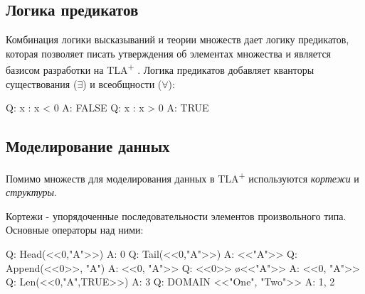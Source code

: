 \documentclass[14pt, openany]{report}
\newcommand{\tlapl}{TLA\textsuperscript{+} }
\begin{document}
\subsection{Логика предикатов}
Комбинация логики высказываний и теории множеств дает логику предикатов, которая позволяет писать утверждения об элементах множества и является базисом разработки на \tlapl. Логика предикатов добавляет кванторы существования (\(\exists\)) и всеобщности (\(\forall\)):

\begin{tla}
  Q: \E x : x < 0
  A: FALSE
  Q: \A x : x > 0
  A: TRUE
\end{tla}
\begin{tlatex}
%
%
%
%
\end{tlatex}

\subsection{Моделирование данных}
Помимо множеств для моделирования данных в \tlapl используются \emph{кортежи} и \emph{структуры}.

Кортежи - упорядоченные последовательности элементов произвольного типа. Основные операторы над ними:
\begin{tla}
  Q: Head(<<0,"A">>)
  A: 0
  Q: Tail(<<0,"A">>)
  A: <<"A">>
  Q: Append(<<0>>, "A")
  A: <<0, "A">>
  Q: <<0>> \o <<"A">> 
  A: <<0, "A">>
  Q: Len(<<0,"A",TRUE>>)
  A: 3
  Q: DOMAIN <<"One", "Two">> 
  A: {1, 2}
\end{tla}
\begin{tlatex}
%
%
%
%
%
%
%
%
%
%
%
\end{tlatex}
\end{document}
